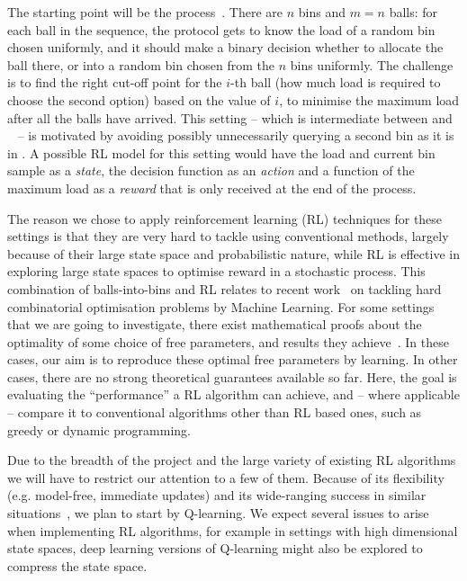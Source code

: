 The starting point will be the \TwoThinning process~\cite{feldheim2021thinning}. There are $n$ bins and $m=n$ balls: for each ball in the sequence, the protocol gets to know the load of a random bin chosen uniformly, and it should make a binary decision whether to allocate the ball there, or into a random bin chosen from the $n$ bins uniformly. The challenge is to find the right cut-off point for the $i$-th ball (how much load is required to choose the second option) based on the value of $i$, to minimise the maximum load after all the balls have arrived. This setting -- which is intermediate between \OneChoice and \TwoChoice~\cite{feldheim2021thinning} -- is motivated by avoiding possibly unnecessarily querying a second bin as it is in \TwoChoice. A possible RL model for this setting would have the load and current bin sample as a \textit{state}, the decision function as an \textit{action} and a function of the maximum load as a \textit{reward} that is only received at the end of the process.


The reason we chose to apply reinforcement learning (RL) techniques for these settings is that they are very hard to tackle using conventional methods, largely because of their large state space and probabilistic nature, while RL is effective in exploring large state spaces to optimise reward in a stochastic process. This combination of balls-into-bins and RL relates to recent work~\cite{mitzenmacher2020algorithms} on tackling hard combinatorial optimisation problems by Machine Learning. For some settings that we are going to investigate, there exist mathematical proofs about the optimality of some choice of free parameters, and results they achieve~\cite{feldheim2021thinning}. In these cases, our aim is to reproduce these optimal free parameters by learning. In other cases, there are no strong theoretical guarantees available so far. Here, the goal is evaluating the ``performance'' a RL algorithm can achieve, and -- where applicable -- compare it to conventional algorithms other than RL based ones, such as greedy or dynamic programming.

Due to the breadth of the project and the large variety of existing RL algorithms we will have to restrict our attention to a few of them. Because of its flexibility (e.g. model-free, immediate updates) and its wide-ranging success in similar situations~\cite{jang2019q}, we plan to start by Q-learning. We expect several issues to arise when implementing RL algorithms, for example in settings with high dimensional state spaces, deep learning versions of Q-learning might also be explored to compress the state space.


